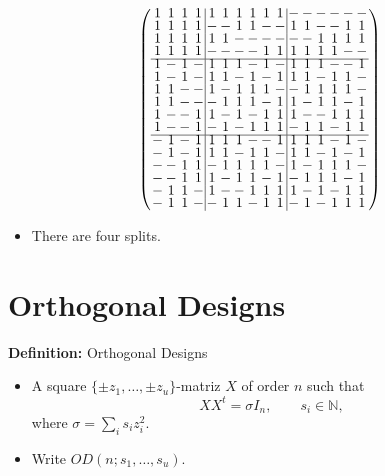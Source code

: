 \documentclass{beamer}
\begin{document}
\begin{frame}

  \[
    \arraycolsep=1.0pt\def\arraystretch{0.75}
    \left(\begin{array}{cccc|cccccc|cccccc}
            1&1&1&1&1&1&1&1&1&1&-&-&-&-&-&-\\
            1&1&1&1&-&-&1&1&-&-&1&1&-&-&1&1\\
            1&1&1&1&1&1&-&-&-&-&-&-&1&1&1&1\\
            1&1&1&1&-&-&-&-&1&1&1&1&1&1&-&-\\ \hline
            1&-&1&-&1&1&1&-&1&-&1&1&1&-&-&1\\
            1&-&1&-&1&1&-&1&-&1&1&1&-&1&1&-\\
            1&1&-&-&1&-&1&1&1&-&-&1&1&1&1&-\\
            1&1&-&-&-&1&1&1&-&1&1&-&1&1&-&1\\
            1&-&-&1&1&-&1&-&1&1&1&-&-&1&1&1\\
            1&-&-&1&-&1&-&1&1&1&-&1&1&-&1&1\\ \hline
            -&1&-&1&1&1&1&-&-&1&1&1&1&-&1&-\\
            -&1&-&1&1&1&-&1&1&-&1&1&-&1&-&1\\
            -&-&1&1&-&1&1&1&1&-&1&-&1&1&1&-\\
            -&-&1&1&1&-&1&1&-&1&-&1&1&1&-&1\\
            -&1&1&-&1&-&-&1&1&1&1&-&1&-&1&1\\
            -&1&1&-&-&1&1&-&1&1&-&1&-&1&1&1\\
          \end{array}\right)
  \]

  \begin{itemize}
    \item There are four splits.
  \end{itemize}

\end{frame}


\section{Orthogonal Designs}

\begin{frame}

  \begin{block}{{\bf Definition:} Orthogonal Designs}
    \begin{itemize}
    \item A square $\{\pm z_1, \dots, \pm z_u\}$-matriz $X$ of order $n$ such
      that
      $$
      XX^t = \sigma I_n, \qquad s_i \in \mathbb{N},
      $$
      where $\sigma = \sum_i s_iz_i^2$.
      \item Write $OD(n;s_1, \dots, s_u)$.
    \end{itemize}
  \end{block}

\end{frame}
\end{document}

